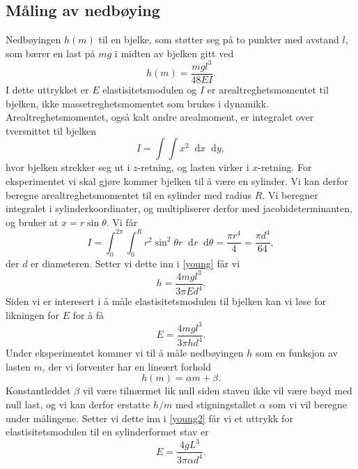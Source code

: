 \documentclass[%
 reprint,
 amsmath,amssymb,
 aps,
 norsk,
 booktabs
]{revtex4-1}
\newcommand*\diff{\mathop{}\!\mathrm{d}}
\begin{document}
\subsection{Måling av nedbøying}
Nedbøyingen $h(m)$ til en bjelke, som støtter seg på to punkter med avstand $l$, som bærer en last på $mg$ i midten av bjelken gitt ved
\begin{equation}
  h(m) = \frac{mgl^3}{48EI}.\label{young}
\end{equation}
I dette uttrykket er $E$ elastisitetsmodulen og $I$ er arealtreghetsmomentet til bjelken, ikke massetreghetsmomentet som brukes i dynamikk. Arealtreghetsmomentet, også kalt andre arealmoment, er integralet over tversnittet til bjelken
\begin{equation*}
  I = \int\int x^2 \diff x \diff y,
\end{equation*}hvor bjelken strekker seg ut i $z$-retning, og lasten virker i $x$-retning. For eksperimentet vi skal gjøre kommer bjelken til å være en sylinder. Vi kan derfor beregne arealtreghetsmomentet til en sylinder med radius $R$. Vi beregner integralet i sylinderkoordinater, og multipliserer derfor med jacobideterminanten, og bruker at $x = r\sin{\theta}$. Vi får
\begin{equation*}
  I = \int_0^{2\pi} \int_0^R r^2\sin^2{\theta}r \diff r \diff \theta = \frac{\pi r^4}{4} = \frac{\pi d^4}{64},
\end{equation*}
der $d$ er diameteren. Setter vi dette inn i \eqref{young} får vi
\begin{equation*}
  h = \frac{4mgl^3}{3\pi Ed^4}.
\end{equation*}
Siden vi er interesert i å måle elastisitetsmodulen til bjelken kan vi løse for likningen for $E$ for å få
\begin{equation}
  E = \frac{4mgl^3}{3\pi hd^4}. \label{young2}
\end{equation}
Under eksperimentet kommer vi til å måle nedbøyingen $h$ som en funksjon av lasten $m$, der vi forventer har en lineært forhold
\begin{equation*}
  h(m) = \alpha m + \beta.
\end{equation*}
Konstantleddet $\beta$ vil være tilnærmet lik null siden staven ikke vil være bøyd med null last, og vi kan derfor erstatte $h/m$ med stigningstallet $\alpha$ som vi vil beregne under målingene. Setter vi dette inn i \eqref{young2} får vi et uttrykk for elastisitetsmodulen til en sylinderformet stav er
\begin{equation}
  E = \frac{4gL^3}{3\pi \alpha d^4}. \label{young3}
\end{equation}
\end{document}
